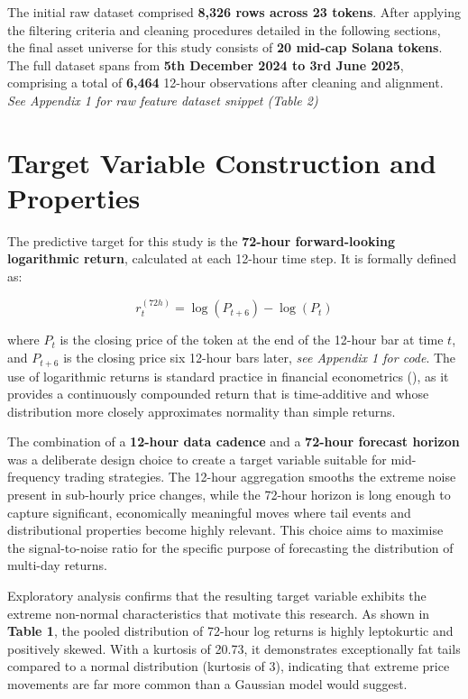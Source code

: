 \documentclass[
  a4paper,
  DIV=11,
  numbers=noendperiod]{scrreprt}
\begin{document}
The initial raw dataset comprised \textbf{8,326 rows across 23 tokens}.
After applying the filtering criteria and cleaning procedures detailed
in the following sections, the final asset universe for this study
consists of \textbf{20 mid-cap Solana tokens}. The full dataset spans
from \textbf{5th December 2024 to 3rd June 2025}, comprising a total of
\textbf{6,464} 12-hour observations after cleaning and alignment.
\emph{See Appendix 1 for raw feature dataset snippet (Table 2)}

\section{Target Variable Construction and
Properties}\label{target-variable-construction-and-properties}

The predictive target for this study is the \textbf{72-hour
forward-looking logarithmic return}, calculated at each 12-hour time
step. It is formally defined as:

\[r^{(72h)}_t = \log(P_{t+6}) - \log(P_t)\]

where \(P_t\) is the closing price of the token at the end of the
12-hour bar at time \(t\), and \(P_{t+6}\) is the closing price six
12-hour bars later, \emph{see Appendix 1 for code}. The use of
logarithmic returns is standard practice in financial econometrics
(), as it
provides a continuously compounded return that is time-additive and
whose distribution more closely approximates normality than simple
returns.

The combination of a \textbf{12-hour data cadence} and a \textbf{72-hour
forecast horizon} was a deliberate design choice to create a target
variable suitable for mid-frequency trading strategies. The 12-hour
aggregation smooths the extreme noise present in sub-hourly price
changes, while the 72-hour horizon is long enough to capture
significant, economically meaningful moves where tail events and
distributional properties become highly relevant. This choice aims to
maximise the signal-to-noise ratio for the specific purpose of
forecasting the distribution of multi-day returns.

Exploratory analysis confirms that the resulting target variable
exhibits the extreme non-normal characteristics that motivate this
research. As shown in \textbf{Table 1}, the pooled distribution of
72-hour log returns is highly leptokurtic and positively skewed. With a
kurtosis of 20.73, it demonstrates exceptionally fat tails compared to a
normal distribution (kurtosis of 3), indicating that extreme price
movements are far more common than a Gaussian model would suggest.
\end{document}
